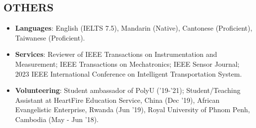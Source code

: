 \documentclass[overlapped]{res}
\begin{document}
\begin{resume}


\section{OTHERS}
\begin{itemize}
  \item \textbf{Languages}: English (IELTS 7.5), Mandarin (Native), Cantonese (Proficient), Taiwanese (Proficient).
  \item \textbf{Services}: Reviewer of IEEE Transactions on Instrumentation and Measurement; IEEE Transactions on Mechatronics; IEEE Sensor Journal; 2023 IEEE International Conference on Intelligent Transportation System.
  \item \textbf{Volunteering}: Student ambassador of PolyU ('19-'21); Student/Teaching Assistant at HeartFire Education Service, China (Dec '19), African Evangelistic Enterprise, Rwanda (Jun '19), Royal University of Phnom Penh, Cambodia (May - Jun '18).
\end{itemize}





\end{resume}
\end{document}
